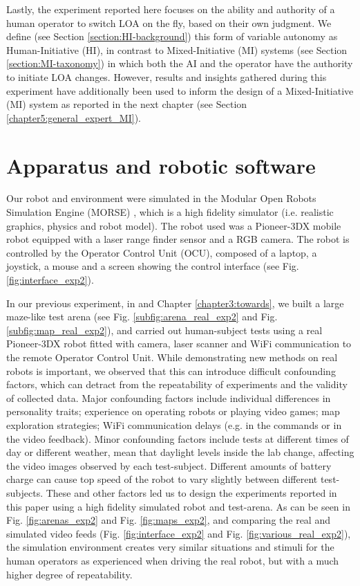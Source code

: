 \documentclass[a4paper,12pt,oneside,openright]{bhamthesis}
\begin{document}
Lastly, the experiment reported here focuses on the ability and authority of a human operator to switch LOA on the fly, based on their own judgment. We define (see Section \ref{section:HI-background}) this form of variable autonomy as Human-Initiative (HI), in contrast to Mixed-Initiative (MI) systems (see Section \ref{section:MI-taxonomy}) in which both the AI and the operator have the authority to initiate LOA changes. However, results and insights gathered during this experiment have additionally been used to inform the design of a Mixed-Initiative (MI) system as reported in the next chapter (see Section \ref{chapter5:general_expert_MI}).

\section{Apparatus and robotic software}
Our robot and environment were simulated in the Modular Open Robots Simulation Engine (MORSE) \cite{Echeverria2011}, which is a high fidelity simulator (i.e. realistic graphics, physics and robot model). The robot used was a Pioneer-3DX mobile robot equipped with a laser range finder sensor and a RGB camera. The robot is controlled by the Operator Control Unit (OCU), composed of a laptop, a joystick, a mouse and a screen showing the control interface (see Fig. \ref{fig:interface_exp2}).

In our previous experiment, in \cite{Chiou2015} and Chapter \ref{chapter3:towards}, we built a large maze-like test arena (see Fig. \ref{subfig:arena_real_exp2} and Fig. \ref{subfig:map_real_exp2}), and carried out human-subject tests using a real Pioneer-3DX robot fitted with camera, laser scanner and WiFi communication to the remote Operator Control Unit. While demonstrating new methods on real robots is important, we observed that this can introduce difficult confounding factors, which can detract from the repeatability of experiments and the validity of collected data. Major confounding factors include individual differences in personality traits; experience on operating robots or playing video games; map exploration strategies; WiFi communication delays (e.g. in the commands or in the video feedback). Minor confounding factors include tests at different times of day or different weather, mean that daylight levels inside the lab change, affecting the video images observed by each test-subject. Different amounts of battery charge can cause top speed of the robot to vary slightly between different test-subjects. These and other factors led us to design the experiments reported in this paper using a high fidelity simulated robot and test-arena. As can be seen in Fig. \ref{fig:arenas_exp2} and Fig. \ref{fig:maps_exp2}, and comparing the real and simulated video feeds (Fig. \ref{fig:interface_exp2} and Fig. \ref{fig:various_real_exp2}), the simulation environment creates very similar situations and stimuli for the human operators as experienced when driving the real robot, but with a much higher degree of repeatability.
\end{document}
